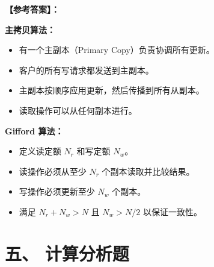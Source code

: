 \documentclass[a4paper,12pt]{article}
\newcommand{\answer}[1]{\par\vspace{0.5em}\hspace{2em}\textbf{【参考答案】：}\\{\color{blue}#1}\par\vspace{1em}}
\begin{document}
\begin{enumerate}[label=\arabic*.]
    \answer{
    \textbf{主拷贝算法：}
    \begin{itemize}
        \item 有一个主副本（Primary Copy）负责协调所有更新。
        \item 客户的所有写请求都发送到主副本。
        \item 主副本按顺序应用更新，然后传播到所有从副本。
        \item 读取操作可以从任何副本进行。
    \end{itemize}
    
    \textbf{Gifford 算法：}
    \begin{itemize}
        \item 定义读定额 $N_r$ 和写定额 $N_w$。
        \item 读操作必须从至少 $N_r$ 个副本读取并比较结果。
        \item 写操作必须更新至少 $N_w$ 个副本。
        \item 满足 $N_r + N_w > N$ 且 $N_w > N/2$ 以保证一致性。
    \end{itemize}
    }
\end{enumerate}

\section{五、 计算分析题}
\end{document}
